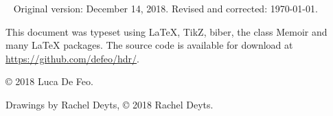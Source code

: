 \begin{titlingpage}
  ~\vfill
  \footnotesize
  Original version: December 14, 2018. Revised and corrected: \today.
  
  \bigskip

  This document was typeset using \LaTeX{}, TikZ, biber, the class
  Memoir and many \LaTeX{} packages. The source code is available for
  download at \url{https://github.com/defeo/hdr/}.

  \bigskip

  \copyright{} 2018 Luca De Feo.
  
  \bigskip

  \ifartwork
  Drawings by Rachel Deyts, \copyright{} 2018 Rachel Deyts.
  \bigskip\fi

  \doclicenseThis
\end{titlingpage}
